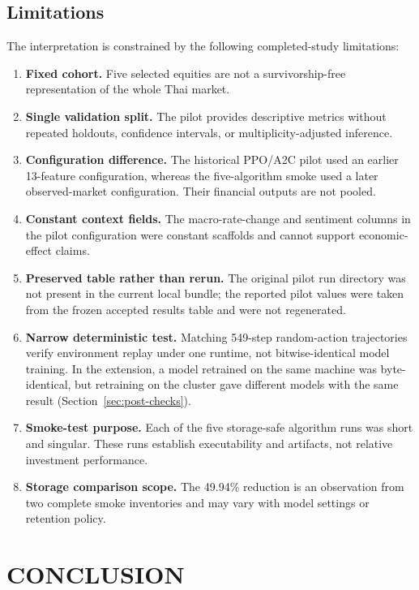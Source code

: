 \documentclass[12pt,a4paper,oneside]{book}
\begin{document}
\section{Limitations}

The interpretation is constrained by the following completed-study limitations:
\begin{enumerate}
  \item \textbf{Fixed cohort.} Five selected equities are not a survivorship-free representation of the whole Thai market.
  \item \textbf{Single validation split.} The pilot provides descriptive metrics without repeated holdouts, confidence intervals, or multiplicity-adjusted inference.
  \item \textbf{Configuration difference.} The historical PPO/A2C pilot used an earlier 13-feature configuration, whereas the five-algorithm smoke used a later observed-market configuration. Their financial outputs are not pooled.
  \item \textbf{Constant context fields.} The macro-rate-change and sentiment columns in the pilot configuration were constant scaffolds and cannot support economic-effect claims.
  \item \textbf{Preserved table rather than rerun.} The original pilot run directory was not present in the current local bundle; the reported pilot values were taken from the frozen accepted results table and were not regenerated.
  \item \textbf{Narrow deterministic test.} Matching 549-step random-action trajectories verify environment replay under one runtime, not bitwise-identical model training. In the extension, a model retrained on the same machine was byte-identical, but retraining on the cluster gave different models with the same result (Section~\ref{sec:post-checks}).
  \item \textbf{Smoke-test purpose.} Each of the five storage-safe algorithm runs was short and singular. These runs establish executability and artifacts, not relative investment performance.
  \item \textbf{Storage comparison scope.} The 49.94\% reduction is an observation from two complete smoke inventories and may vary with model settings or retention policy.
\end{enumerate}

\FloatBarrier

\chapter{CONCLUSION}
\end{document}
